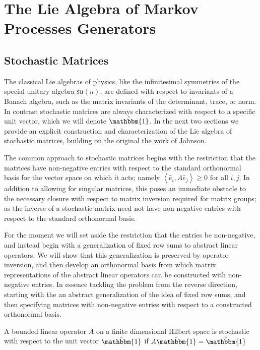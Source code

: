 \chapter{The Lie Algebra of Markov Processes Generators}
\section{Stochastic Matrices}
The classical Lie algebras of physics, like the infinitesimal symmetries
of the special unitary algebra $\mathfrak{su}(n)$, are defined with respect to
invariants of a Banach algebra, such as the matrix invariants of the 
determinant, trace, or norm. In contrast stochastic matrices are always 
characterized with respect to a specific unit vector, which we will denote 
$\hat{\mathbbm{1}}$. In the next two sections we provide an explicit 
construction and characterization of the Lie algebra of stochastic matrices, 
building on the original the work of Johnson\cite{johnson_markovtype_1985}.

The common approach to stochastic matrices begins with the restriction that the 
matrices have non-negative entries with respect to the standard orthonormal 
basis for the vector space on which it acts; namely $\left\langle\hat{e}_i,A \hat{e}_j\right\rangle \ge 0$
for all $i,j$. In addition to allowing for singular matrices, this poses an 
immediate obstacle to the necessary closure with respect to matrix inversion 
required for matrix groups; as the inverse of a stochastic matrix need not have 
non-negative entries with respect to the standard orthonormal basis. 

For the moment we will set aside the restriction that the entries be 
non-negative, and instead begin with a generalization of fixed row sums to 
abstract linear operators. We will show that this generalization is preserved by 
operator inversion, and then develop an orthonormal basis from which matrix 
representations of the abstract linear operators can be constructed with 
non-negative entries. In essence tackling the problem from the reverse 
direction, starting with the an abstract generalization of the idea of fixed row 
sums, and then specifying matrices with non-negative entries with respect to a 
constructed orthonormal basis.

\begin{definition}
	A bounded linear operator $A$ on a finite dimensional Hilbert space is 
	stochastic with respect to the unit vector $\hat{\mathbbm{1}}$ if $A \hat{\mathbbm{1}} = \hat{\mathbbm{1}}$
\end{definition}

